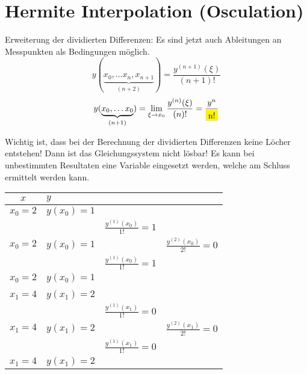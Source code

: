 \section{Hermite Interpolation (Osculation)}
Erweiterung der dividierten Differenzen: Es sind jetzt auch Ableitungen an Messpunkten als 
Bedingungen möglich.
$$y(\underbrace{x_0, \ldots x_n, x_{n+1}}_{(n+2)}) = \frac{y^{(n+1)}(\xi)}{(n+1)!}$$
$$y(\underbrace{x_0, \ldots x_0}_{(n+1)}) = \lim_{\xi \rightarrow x_0} \frac{y^{(n)}(\xi)}{(n)!} = \frac{y^{n}}{\hilight{n!}}$$

Wichtig ist, dass bei der Berechnung der dividierten Differenzen keine Löcher entstehen! Dann ist das 
Gleichungssystem nicht lösbar! Es kann bei unbestimmten Resultaten eine Variable eingesetzt werden,
welche am Schluss ermittelt werden kann.
\renewcommand{\arraystretch}{1.0}
\begin{minipage}{10cm}
	\begin{tabular}{|c|lll|}
		\hline
		$x$		&\multicolumn{3}{l|}{$y$}\\
		\hline
		$x_0=2$	&$y(x_0)=1$	&							&\\
				&			&$\frac{y^{(1)}(x_0)}{1!}=1$&\\
		$x_0=2$	&$y(x_0)=1$	&							&$\frac{y^{(2)}(x_0)}{2!}=0$\\
				&			&$\frac{y^{(1)}(x_0)}{1!}=1$&\\
		$x_0=2$	&$y(x_0)=1$	&							&\\
				&			&							&\\
		$x_1=4$	&$y(x_1)=2$	&							&\\
				&			&$\frac{y^{(1)}(x_1)}{1!}=0$&\\
		$x_1=4$	&$y(x_1)=2$	&							&$\frac{y^{(2)}(x_1)}{2!}=0$\\
				&			&$\frac{y^{(1)}(x_1)}{1!}=0$&\\
		$x_1=4$	&$y(x_1)=2$	&							&\\
		\hline
	\end{tabular}
\end{minipage}
\hfill
